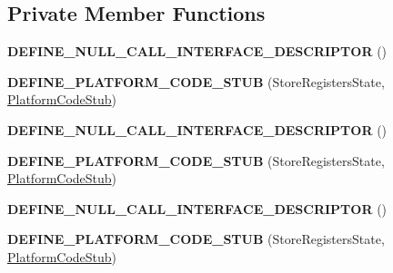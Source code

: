 \subsection*{Private Member Functions}
\begin{DoxyCompactItemize}
\item 
{\bfseries D\+E\+F\+I\+N\+E\+\_\+\+N\+U\+L\+L\+\_\+\+C\+A\+L\+L\+\_\+\+I\+N\+T\+E\+R\+F\+A\+C\+E\+\_\+\+D\+E\+S\+C\+R\+I\+P\+T\+OR} ()\hypertarget{classv8_1_1internal_1_1_store_registers_state_stub_adc9bb5c33baab06dc4de44524798a5ba}{}\label{classv8_1_1internal_1_1_store_registers_state_stub_adc9bb5c33baab06dc4de44524798a5ba}

\item 
{\bfseries D\+E\+F\+I\+N\+E\+\_\+\+P\+L\+A\+T\+F\+O\+R\+M\+\_\+\+C\+O\+D\+E\+\_\+\+S\+T\+UB} (Store\+Registers\+State, \hyperlink{classv8_1_1internal_1_1_platform_code_stub}{Platform\+Code\+Stub})\hypertarget{classv8_1_1internal_1_1_store_registers_state_stub_ae017aa864ce3fdfc7425b095b84ad599}{}\label{classv8_1_1internal_1_1_store_registers_state_stub_ae017aa864ce3fdfc7425b095b84ad599}

\item 
{\bfseries D\+E\+F\+I\+N\+E\+\_\+\+N\+U\+L\+L\+\_\+\+C\+A\+L\+L\+\_\+\+I\+N\+T\+E\+R\+F\+A\+C\+E\+\_\+\+D\+E\+S\+C\+R\+I\+P\+T\+OR} ()\hypertarget{classv8_1_1internal_1_1_store_registers_state_stub_adc9bb5c33baab06dc4de44524798a5ba}{}\label{classv8_1_1internal_1_1_store_registers_state_stub_adc9bb5c33baab06dc4de44524798a5ba}

\item 
{\bfseries D\+E\+F\+I\+N\+E\+\_\+\+P\+L\+A\+T\+F\+O\+R\+M\+\_\+\+C\+O\+D\+E\+\_\+\+S\+T\+UB} (Store\+Registers\+State, \hyperlink{classv8_1_1internal_1_1_platform_code_stub}{Platform\+Code\+Stub})\hypertarget{classv8_1_1internal_1_1_store_registers_state_stub_ae017aa864ce3fdfc7425b095b84ad599}{}\label{classv8_1_1internal_1_1_store_registers_state_stub_ae017aa864ce3fdfc7425b095b84ad599}

\item 
{\bfseries D\+E\+F\+I\+N\+E\+\_\+\+N\+U\+L\+L\+\_\+\+C\+A\+L\+L\+\_\+\+I\+N\+T\+E\+R\+F\+A\+C\+E\+\_\+\+D\+E\+S\+C\+R\+I\+P\+T\+OR} ()\hypertarget{classv8_1_1internal_1_1_store_registers_state_stub_adc9bb5c33baab06dc4de44524798a5ba}{}\label{classv8_1_1internal_1_1_store_registers_state_stub_adc9bb5c33baab06dc4de44524798a5ba}

\item 
{\bfseries D\+E\+F\+I\+N\+E\+\_\+\+P\+L\+A\+T\+F\+O\+R\+M\+\_\+\+C\+O\+D\+E\+\_\+\+S\+T\+UB} (Store\+Registers\+State, \hyperlink{classv8_1_1internal_1_1_platform_code_stub}{Platform\+Code\+Stub})\hypertarget{classv8_1_1internal_1_1_store_registers_state_stub_ae017aa864ce3fdfc7425b095b84ad599}{}\label{classv8_1_1internal_1_1_store_registers_state_stub_ae017aa864ce3fdfc7425b095b84ad599}


\end{DoxyCompactItemize}

